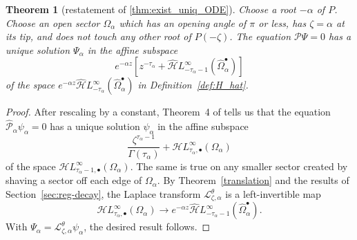 \documentclass{article}
\newcommand{\singexp}[2]{\mathcal{H}L^\infty_{#1, #2}}
\newcommand{\singexpalg}[1]{\singexp{#1}{\bullet}}
\newcommand{\dualsingexp}[1]{\widehat{\mathcal{H}}L^\infty_{#1}}
\newcommand{\laplace}{\mathcal{L}}
\theoremstyle{definition}
\theoremstyle{plain}
\newtheorem{theorem}{Theorem}[section]
\begin{document}
\begin{theorem}[restatement of \ref{thm:exist_uniq_ODE}]\label{re:thm:exist_uniq_ODE}
Choose a root $-\alpha$ of $P$. Choose an open sector $\Omega_\alpha$ which has an opening angle of $\pi$ or less, has $\zeta = \alpha$ at its tip, and does not touch any other root of $P(-\zeta)$. The equation $\mathcal{P}\Psi = 0$ has a unique solution $\Psi_\alpha$ in the affine subspace
\[ e^{-\alpha z} \left[ z^{-\tau_\alpha} + \dualsingexp{-\tau_\alpha-1}(\widehat{\Omega}_\alpha^\bullet) \right] \]
of the space $e^{-\alpha z} \dualsingexp{-\tau_\alpha}(\widehat{\Omega}_\alpha^\bullet)$ in Definition~\ref{def:H_hat}.
\end{theorem}
\begin{center}
\label{fig:sectorial_domain--with roots P}
\end{center}
\begin{proof}
After rescaling by a constant, Theorem~4 of \cite{reg-sing-volterra} tells us that the equation $\hat{\mathcal{P}}_\alpha \psi_\alpha = 0$ has a unique solution $\psi_\alpha$ in the affine subspace
\[ \frac{\zeta^{\tau_\alpha-1}}{\Gamma(\tau_\alpha)} + \singexpalg{\tau_\alpha}(\Omega_\alpha) \]
of the space $\singexpalg{\tau_\alpha-1}(\Omega_\alpha)$. The same is true on any smaller sector created by shaving a sector off each edge of $\Omega_\alpha$. By Theorem~\ref{translation} and the results of Section~\ref{sec:reg-decay}, the Laplace transform $\laplace^\theta_{\zeta, \alpha}$ is a left-invertible map
\[ \singexpalg{\tau_\alpha}(\Omega_\alpha) \to e^{-\alpha z} \dualsingexp{-\tau_\alpha-1}(\widehat{\Omega}_\alpha^\bullet). \]
With $\Psi_\alpha = \laplace^\theta_{\zeta, \alpha} \psi_\alpha$, the desired result follows.
\end{proof}
\end{document}
